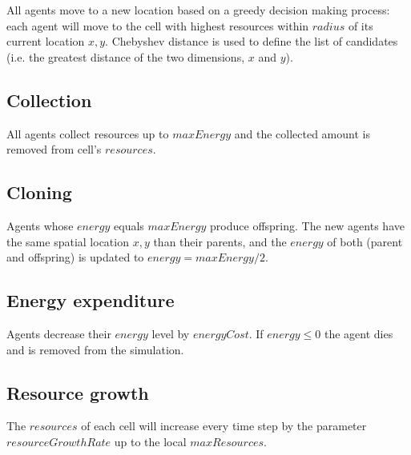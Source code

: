 \documentclass[11pt,a4paper,twocolumn,notitlepage]{article}
\begin{document}
All agents move to a new location based on a greedy decision making process: each agent will move to the cell with highest resources within $radius$ of its current location $x,y$. Chebyshev distance is used to define the list of candidates (i.e. the greatest distance of the two dimensions, $x$ and $y$).

\subsection{Collection}

All agents collect resources up to $maxEnergy$ and the collected amount is removed from cell's $resources$. 

\subsection{Cloning}

Agents whose $energy$ equals $maxEnergy$ produce offspring. The new agents have the same spatial location $x,y$ than their parents, and the $energy$ of both (parent and offspring) is updated to $energy = maxEnergy/2$.

\subsection{Energy expenditure}

Agents decrease their $energy$ level by $energyCost$. If $energy \leq 0$ the agent dies and is removed from the simulation.

\subsection{Resource growth}

The $resources$ of each cell will increase every time step by the parameter $resourceGrowthRate$ up to the local $maxResources$.
\end{document}
